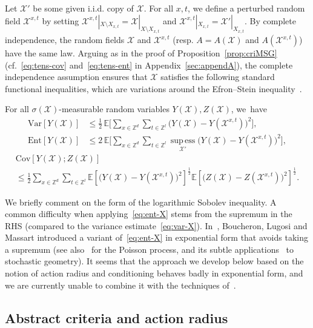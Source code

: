 \documentclass[10pt]{amsart}
\theoremstyle{definition}\newtheorem{defi}[theo]{Definition}\newtheorem{rema}[theo]{Remark}\newtheorem{exam}[theo]{Example}\newtheorem{exem}[theo]{Example}\newtheorem{nota}[theo]{Notation}
\newcommand{\Z}{\mathbb Z}
\newcommand{\expecM}[1]{\mathbb{E}\bigg[#1 \bigg]}
\newcommand{\expec}[1]{\mathbb{E}\left[#1 \right]}
\newcommand{\X}{\mathcal X}
\DeclareMathOperator{\supess}{sup\,ess}
\newcommand{\supessd}[1]{\mathrel{\mathop{\supess}\limits_{#1}}}
\newcommand{\var}[1]{\mathrm{Var}\left[#1\right]}
\newcommand{\ent}[1]{\mathrm{Ent}\!\left[#1\right]}
\newcommand{\cov}[2]{\mathrm{Cov}\left[#1;#2\right]}
\begin{document}

Let $\X'$ be some given i.i.d. copy of $\X$. For all $x,t$, we define a perturbed random field $\X^{x,t}$ by setting $\X^{x,t}|_{X\setminus X_{x,t}}=\X|_{X\setminus X_{x,t}}$ and $\X^{x,t}|_{X_{x,t}}=\X'|_{X_{x,t}}$. By complete independence, the random fields $\X$ and $\X^{x,t}$ (resp. $A=A(\X)$ and $A(\X^{x,t})$) have the same law. Arguing as in the proof of Proposition~\ref{prop:criMSG} (cf.~\eqref{eq:tens-cov} and~\eqref{eq:tens-ent} in Appendix~\ref{sec:appendA}), the complete independence assumption ensures that $\X$ satisfies the following standard functional inequalities, which are variations around the Efron--Stein inequality~\cite{Efron-Stein-81,Steele-86}.

\begin{prop}\label{prop:sgindep}
For all $\sigma(\X)$-measurable random variables $Y(\X),Z(\X)$, we~have
\begin{align}
\var{Y(\X)}&\le\frac12\,\expecM{\sum_{x\in\Z^d}\sum_{t\in\Z^l}\big(Y(\X)-Y(\X^{x,t})\big)^2},\label{eq:var-X}
\\
\ent{Y(\X)}&\le 2\,\expecM{\sum_{x\in\Z^d}\sum_{t\in\Z^l}\supessd{\X'}\big(Y(\X)-Y(\X^{x,t})\big)^2},\label{eq:ent-X}
\end{align}
\begin{multline}\label{eq:cov-X}
\cov{Y(\X)}{Z(\X)}\\
\le \frac12\sum_{x\in\Z^d}\sum_{t\in\Z^l}\expec{ \big(Y(\X)-Y(\X^{x,t})\big)^2}^\frac12\expec{ \big(Z(\X)-Z(\X^{x,t})\big)^2}^\frac12.
\end{multline}
\qedhere
\end{prop}

We briefly comment on the form of the logarithmic Sobolev inequality. A common difficulty when applying~\eqref{eq:ent-X} stems from the supremum in the RHS (compared to the variance estimate~\eqref{eq:var-X}). In~\cite{BLM-03}, Boucheron, Lugosi and Massart introduced a variant of~\eqref{eq:ent-X} in exponential form that avoids taking a supremum (see also~\cite{Wu00} for the Poisson process, and its subtle applications~\cite{BachPec} to stochastic geometry). It seems that the approach we develop below based on the notion of action radius and conditioning behaves badly in exponential form, and we are currently unable to combine it with the techniques of~\cite{BLM-03}.



\subsection{Abstract criteria and action radius}\label{chap:condunif-pasunif}
\end{document}
